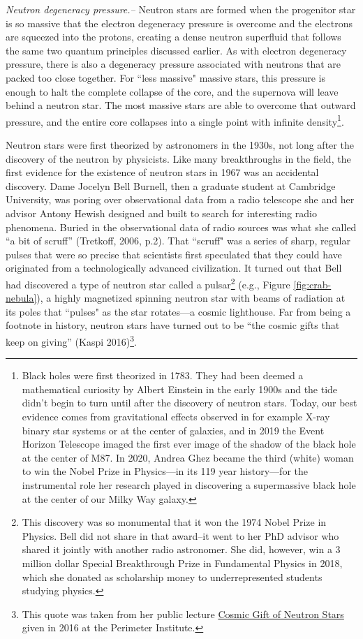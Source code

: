 \documentclass[1.5,11pt]{beavtex}
\begin{document}
\textit{Neutron degeneracy pressure.–} Neutron stars are formed when the progenitor star is so massive that the electron degeneracy pressure is overcome and the electrons are squeezed into the protons, creating a dense neutron superfluid that follows the same two quantum principles discussed earlier. As with electron degeneracy pressure, there is also a degeneracy pressure associated with neutrons that are packed too close together. For ``less massive" massive stars, this pressure is enough to halt the complete collapse of the core, and the supernova will leave behind a neutron star. The most massive stars are able to overcome that outward pressure, and the entire core collapses into a single point with infinite density\footnote{\selectfont Black holes were first theorized in 1783. They had been deemed a mathematical curiosity by Albert Einstein in the early 1900s and the tide didn't begin to turn until after the discovery of neutron stars. Today, our best evidence comes from gravitational effects observed in for example X-ray binary star systems or at the center of galaxies, and in 2019 the Event Horizon Telescope imaged the first ever image of the shadow of the black hole at the center of M87. In 2020, Andrea Ghez became the third (white) woman to win the Nobel Prize in Physics---in its 119 year history---for the instrumental role her research played in discovering a supermassive black hole at the center of our Milky Way galaxy.}.

Neutron stars were first theorized by astronomers in the 1930s, not long after the discovery of the neutron by physicists. Like many breakthroughs in the field, the first evidence for the existence of neutron stars in 1967 was an accidental discovery. Dame Jocelyn Bell Burnell, then a graduate student at Cambridge University, was poring over observational data from a radio telescope she and her advisor Antony Hewish designed and built to search for interesting radio phenomena. Buried in the observational data of radio sources was what she called ``a bit of scruff'' (Tretkoff, 2006, p.2). That ``scruff" was a series of sharp, regular pulses that were so precise that scientists first speculated that they could have originated from a technologically advanced civilization. It turned out that Bell had discovered a type of neutron star called a pulsar\footnote{\selectfont This discovery was so monumental that it won the 1974 Nobel Prize in Physics. Bell did not share in that award–it went to her PhD advisor who shared it jointly with another radio astronomer. She did, however, win a 3 million dollar Special Breakthrough Prize in Fundamental Physics in 2018, which she donated as scholarship money to underrepresented students studying physics.}  (e.g., Figure \ref{fig:crab-nebula}), a highly magnetized spinning neutron star with beams of radiation at its poles that ``pulses" as the star rotates---a cosmic lighthouse. Far from being a footnote in history, neutron stars have turned out to be ``the cosmic gifts that keep on giving'' (Kaspi 2016)\footnote{\selectfont This quote was taken from her public lecture \href{https://perimeterinstitute.ca/videos/victoria-kaspi-cosmic-gift-neutron-stars}{Cosmic Gift of Neutron Stars} given in 2016 at the Perimeter Institute.}. 
\end{document}
